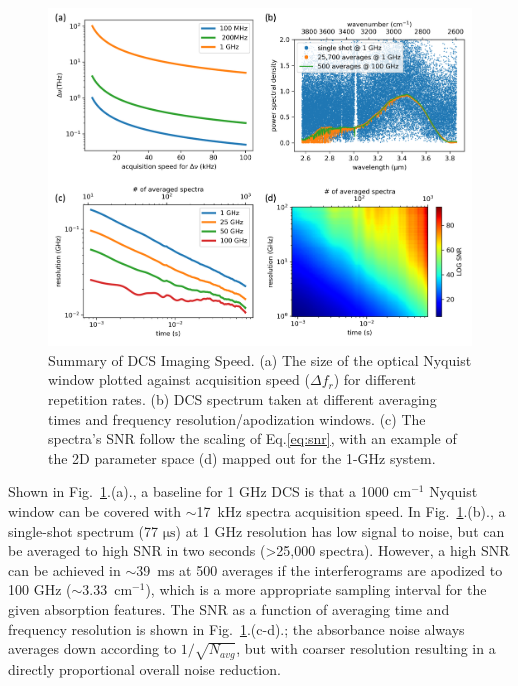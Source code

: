 \documentclass{optica-article}
\begin{document}

\begin{figure}[h]
    \centering
    \includegraphics[width=\linewidth]{snr_analysis.png}
    \caption{Summary of DCS Imaging Speed. (a) The size of the optical Nyquist window plotted against acquisition speed (\mbox{$\Delta f_r$}) for different repetition rates. (b) DCS spectrum taken at different averaging times and frequency resolution/apodization windows. (c) The spectra's SNR follow the scaling of \mbox{Eq.\ref{eq:snr}}, with an example of the 2D parameter space (d) mapped out for the 1-GHz system.}
    \label{fig:snr_analysis}
\end{figure}

Shown in \mbox{Fig. \ref{fig:snr_analysis}.(a).}, a baseline for 1 GHz DCS is that a 1000 $\mathrm{cm^{-1}}$ Nyquist window can be covered with \mbox{$\sim$17 kHz} spectra acquisition speed. In \mbox{Fig. \ref{fig:snr_analysis}.(b).}, a single-shot spectrum (77 $\mathrm{\mu s}$) at 1 GHz resolution has low signal to noise, but can be averaged to high SNR in two seconds (>25,000 spectra). However, a high SNR can be achieved in \mbox{$\sim$39 ms} at 500 averages if the interferograms are apodized to 100 GHz (\mbox{$\sim$3.33 $\mathrm{cm^{-1}}$}), which is a more appropriate sampling interval for the given absorption features. The SNR as a function of averaging time and frequency resolution is shown in \mbox{Fig. \ref{fig:snr_analysis}.(c-d).}; the absorbance noise always averages down according to $1/\sqrt{N_{avg}}$, but with coarser resolution resulting in a directly proportional overall noise reduction. 
\end{document}
